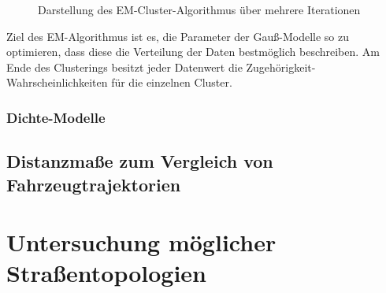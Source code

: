 \begin{figure}[H]
    \centering
    \qquad
    \caption[Darstellung des EM-Cluster-Algorithmus über mehrere Iterationen]{Darstellung des EM-Cluster-Algorithmus über mehrere Iterationen \cite[]{GeorgeSeif2018}}
    \label{fig:grund_em_clustering}
\end{figure}

Ziel des EM-Algorithmus ist es, die Parameter der Gauß-Modelle so zu optimieren, dass diese die Verteilung der Daten bestmöglich beschreiben.
Am Ende des Clusterings besitzt jeder Datenwert die Zugehörigkeit-Wahrscheinlichkeiten für die einzelnen Cluster.

\subsubsection{Dichte-Modelle}

\subsection{Distanzmaße zum Vergleich von Fahrzeugtrajektorien}
\label{sec:distance_measures}

\section{Untersuchung möglicher Straßentopologien}
\label{sec:street_topologies}